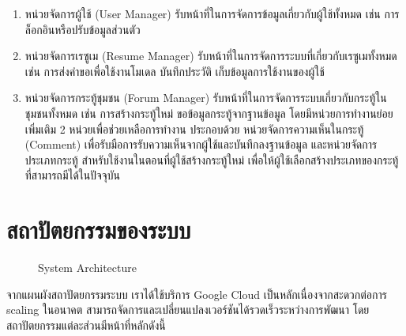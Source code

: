 \begin{enumerate}
    \item หน่วยจัดการผู้ใช้ (User Manager) รับหน้าที่ในการจัดการข้อมูลเกี่ยวกับผู้ใช้ทั้งหมด เช่น การล็อกอินหรือปรับข้อมูลส่วนตัว
    \item หน่วยจัดการเรซูเม (Resume Manager) รับหน้าที่ในการจัดการระบบที่เกี่ยวกับเรซูเมทั้งหมด เช่น การส่งคำขอเพื่อใช้งานโมเดล บันทึกประวัติ เก็บข้อมูลการใช้งานของผู้ใช้
    \item หน่วยจัดการกระทู้ชุมชน (Forum Manager) รับหน้าที่ในการจัดการระบบเกี่ยวกับกระทู้ในชุมชนทั้งหมด เช่น การสร้างกระทู้ใหม่ ขอข้อมูลกระทู้จากฐานข้อมูล
          โดยมีหน่วยการทำงานย่อยเพิ่มเติม 2 หน่วยเพื่อช่วยเหลือการทำงาน ประกอบด้วย หน่วยจัดการความเห็นในกระทู้ (Comment) เพื่อรับมือการรับความเห็นจากผู้ใช้และบันทึกลงฐานข้อมูล
          และหน่วยจัดการประเภทกระทู้ สำหรับใช้งานในตอนที่ผู้ใช้สร้างกระทู้ใหม่ เพื่อให้ผู้ใช้เลือกสร้างประเภทของกระทู้ที่สามารถมีได้ในปัจจุบัน
\end{enumerate}



\section{สถาปัตยกรรมของระบบ}
\begin{figure}[H]\centering
    \setlength{\fboxrule}{0.2mm} %
    \setlength{\fboxsep}{0.5cm}
    \caption{System Architecture}\label{fig:system_architecture}
\end{figure}
จากแผนผังสถาปัตยกรรมระบบ เราได้ใช้บริการ Google Cloud เป็นหลักเนื่องจากสะดวกต่อการ scaling ในอนาคต สามารถจัดการและเปลี่ยนแปลงเวอร์ชันได้รวดเร็วระหว่างการพัฒนา โดยสถาปัตยกรรมแต่ละส่วนมีหน้าที่หลักดังนี้

